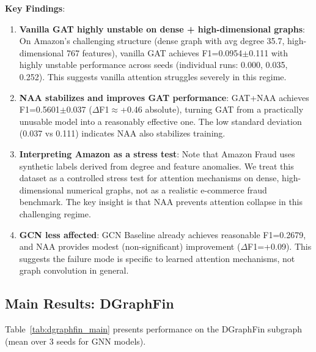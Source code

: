 \textbf{Key Findings}:

\begin{enumerate}
\item \textbf{Vanilla GAT highly unstable on dense + high-dimensional graphs}: On Amazon's challenging structure (dense graph with avg degree 35.7, high-dimensional 767 features), vanilla GAT achieves F1=0.0954$\pm$0.111 with highly unstable performance across seeds (individual runs: 0.000, 0.035, 0.252). This suggests vanilla attention struggles severely in this regime.

\item \textbf{NAA stabilizes and improves GAT performance}: GAT+NAA achieves F1=0.5601$\pm$0.037 ($\Delta$F1$\approx$+0.46 absolute), turning GAT from a practically unusable model into a reasonably effective one. The low standard deviation (0.037 vs 0.111) indicates NAA also stabilizes training.

\item \textbf{Interpreting Amazon as a stress test}: Note that Amazon Fraud uses synthetic labels derived from degree and feature anomalies. We treat this dataset as a controlled stress test for attention mechanisms on dense, high-dimensional numerical graphs, not as a realistic e-commerce fraud benchmark. The key insight is that NAA prevents attention collapse in this challenging regime.

\item \textbf{GCN less affected}: GCN Baseline already achieves reasonable F1=0.2679, and NAA provides modest (non-significant) improvement ($\Delta$F1=+0.09). This suggests the failure mode is specific to learned attention mechanisms, not graph convolution in general.
\end{enumerate}

\subsection{Main Results: DGraphFin}

Table~\ref{tab:dgraphfin_main} presents performance on the DGraphFin
subgraph (mean over 3 seeds for GNN models).

